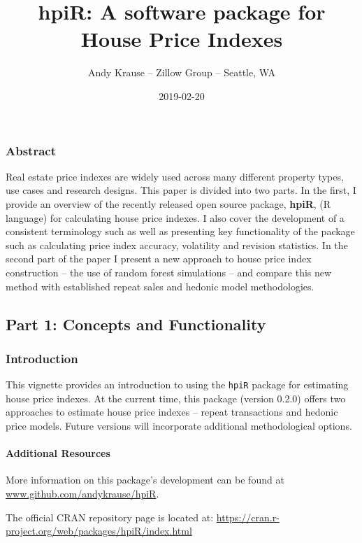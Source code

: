 \documentclass[]{article}
\title{hpiR: A software package for House Price Indexes}
\author{Andy Krause -- Zillow Group -- Seattle, WA}
\date{2019-02-20}
\let\oldparagraph\paragraph
\renewcommand{\paragraph}[1]{\oldparagraph{#1}\mbox{}}
\begin{document}
\maketitle

\subsubsection{Abstract}\label{abstract}

Real estate price indexes are widely used across many different property
types, use cases and research designs. This paper is divided into two
parts. In the first, I provide an overview of the recently released open
source package, \textbf{hpiR}, (R language) for calculating house price
indexes. I also cover the development of a consistent terminology such
as well as presenting key functionality of the package such as
calculating price index accuracy, volatility and revision statistics. In
the second part of the paper I present a new approach to house price
index construction -- the use of random forest simulations -- and
compare this new method with established repeat sales and hedonic model
methodologies.

\subsection{Part 1: Concepts and
Functionality}\label{part-1-concepts-and-functionality}

\subsubsection{Introduction}\label{introduction}

This vignette provides an introduction to using the \texttt{hpiR}
package for estimating house price indexes. At the current time, this
package (version 0.2.0) offers two approaches to estimate house price
indexes -- repeat transactions and hedonic price models. Future versions
will incorporate additional methodological options.

\paragraph{Additional Resources}\label{additional-resources}

More information on this package's development can be found at
\href{https://www.github.com/andykrause/hpiR}{www.github.com/andykrause/hpiR}.

The official CRAN repository page is located at:
\url{https://cran.r-project.org/web/packages/hpiR/index.html}
\end{document}
